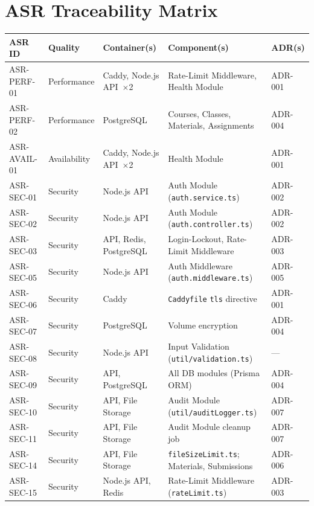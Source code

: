 \documentclass[12pt,a4paper]{article}
\begin{document}
\section{ASR Traceability Matrix}
\label{app:traceability}

\begingroup
\small
\begin{longtable}{L{2cm} L{1.8cm} L{3.5cm} L{3.8cm} L{2.5cm}}
  \toprule
  \textbf{ASR ID} & \textbf{Quality} & \textbf{Container(s)} & \textbf{Component(s)} & \textbf{ADR(s)} \\
  \midrule \endhead \bottomrule \endlastfoot

  ASR-PERF-01 & Performance & Caddy, Node.js API~$\times$2        & Rate-Limit Middleware, Health Module & ADR-001 \\
  ASR-PERF-02 & Performance & PostgreSQL                           & Courses, Classes, Materials, Assignments & ADR-004 \\
  ASR-AVAIL-01 & Availability & Caddy, Node.js API~$\times$2      & Health Module                        & ADR-001 \\
  ASR-SEC-01  & Security    & Node.js API                          & Auth Module (\texttt{auth.service.ts})& ADR-002 \\
  ASR-SEC-02  & Security    & Node.js API                          & Auth Module (\texttt{auth.controller.ts}) & ADR-002 \\
  ASR-SEC-03  & Security    & API, Redis, PostgreSQL               & Login-Lockout, Rate-Limit Middleware  & ADR-003 \\
  ASR-SEC-05  & Security    & Node.js API                          & Auth Middleware (\texttt{auth.middleware.ts}) & ADR-005 \\
  ASR-SEC-06  & Security    & Caddy                                & \texttt{Caddyfile} \texttt{tls} directive & ADR-001 \\
  ASR-SEC-07  & Security    & PostgreSQL                           & Volume encryption                    & ADR-004 \\
  ASR-SEC-08  & Security    & Node.js API                          & Input Validation (\texttt{util/validation.ts}) & --- \\
  ASR-SEC-09  & Security    & API, PostgreSQL                      & All DB modules (Prisma ORM)           & ADR-004 \\
  ASR-SEC-10  & Security    & API, File Storage                    & Audit Module (\texttt{util/auditLogger.ts}) & ADR-007 \\
  ASR-SEC-11  & Security    & API, File Storage                    & Audit Module cleanup job              & ADR-007 \\
  ASR-SEC-14  & Security    & API, File Storage                    & \texttt{fileSizeLimit.ts}; Materials, Submissions & ADR-006 \\
  ASR-SEC-15  & Security    & Node.js API, Redis                   & Rate-Limit Middleware (\texttt{rateLimit.ts}) & ADR-003 \\
\end{longtable}
\endgroup
\end{document}
